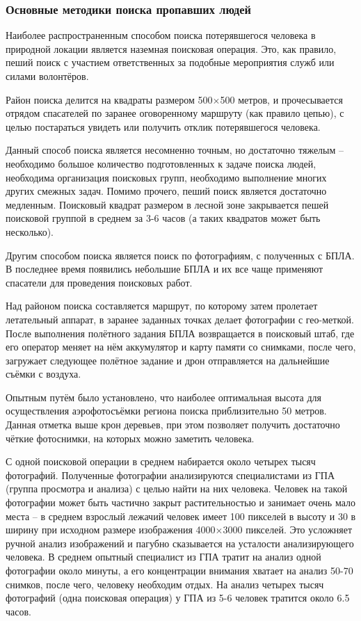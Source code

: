 \subsubsection{Основные методики поиска пропавших людей}

Наиболее распространенным способом поиска потерявшегося человека в природной локации является наземная поисковая операция. Это, как правило, пеший поиск с участием ответственных за подобные мероприятия служб или силами волонтёров. 

Район поиска делится на квадраты размером 500$\times$500 метров, и прочесывается отрядом спасателей по заранее оговоренному маршруту (как правило цепью), с целью постараться увидеть или получить отклик потерявшегося человека. 

Данный способ поиска является несомненно точным, но достаточно тяжелым -- необходимо большое количество подготовленных к задаче поиска людей, необходима организация поисковых групп, необходимо выполнение многих других смежных задач. Помимо прочего, пеший поиск является достаточно медленным. Поисковый квадрат размером в лесной зоне закрывается пешей поисковой группой в среднем за 3-6 часов (а таких квадратов может быть несколько).

Другим способом поиска является поиск по фотографиям, с полученных с БПЛА. В последнее время появились небольшие БПЛА и их все чаще применяют спасатели для проведения поисковых работ. 

Над районом поиска составляется маршрут, по которому затем пролетает летательный аппарат, в заранее заданных точках делает фотографии с гео-меткой. После выполнения полётного задания БПЛА возвращается в поисковый штаб, где его оператор меняет на нём аккумулятор и карту памяти со снимками, после чего, загружает следующее полётное задание и дрон отправляется на дальнейшие съёмки с воздуха.

Опытным путём было установлено, что наиболее оптимальная высота для осуществления аэрофотосъёмки региона поиска приблизительно 50 метров. Данная отметка выше крон деревьев, при этом позволяет получить достаточно чёткие фотоснимки, на которых можно заметить человека.

С одной поисковой операции в среднем набирается около четырех тысяч фотографий. Полученные фотографии анализируются специалистами из ГПА (группа просмотра и анализа) с целью найти на них человека. Человек на такой фотографии может быть частично закрыт растительностью и занимает очень мало места -- в среднем взрослый лежачий человек имеет 100 пикселей в высоту и 30 в ширину при исходном размере изображения 4000$\times$3000 пикселей. Это усложняет ручной анализ изображений и пагубно сказывается на усталости анализирующего человека. В среднем опытный специалист из ГПА тратит на анализ одной фотографии около минуты, а его концентрации внимания хватает на анализ 50-70 снимков, после чего, человеку необходим отдых. На анализ четырех тысяч фотографий (одна поисковая операция) у ГПА из 5-6 человек тратится около 6.5 часов.

\clearpage